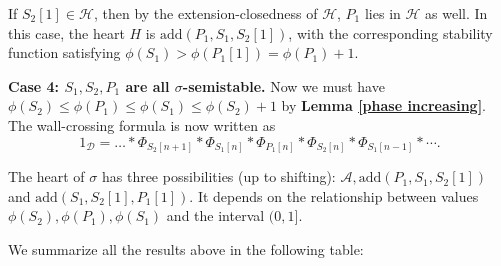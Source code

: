 \documentclass[a4paper,12pt]{amsart}
\newcommand{\add}{\mathrm{add}}
\begin{document}
If $S_2[1]\in\mathcal{H}$, then by the extension-closedness of $\mathcal{H}$, $P_1$ lies in $\mathcal{H}$ as well. In this case, the heart $H$ is $\add(P_1,S_1,S_2[1])$, with the corresponding stability function satisfying $\phi(S_1)>\phi(P_1[1])=\phi(P_1)+1$.

\textbf{Case 4: $S_1,S_2,P_1$ are all $\sigma$-semistable.} Now we must have $\phi(S_2)\leqslant\phi(P_1)\leqslant\phi(S_1)\leqslant\phi(S_2)+1$ by \textbf{Lemma \ref{phase increasing}}. The wall-crossing formula is now written as
\begin{equation}\label{4}
    1_\mathcal{D}=\dots*\Phi_{S_2[n+1]}*\Phi_{S_1[n]}*\Phi_{P_1[n]}*\Phi_{S_2[n]}*\Phi_{S_1[n-1]}*\cdots.
\end{equation}

The heart of $\sigma$ has three possibilities (up to shifting): $\mathcal{A},\add(P_1,S_1,S_2[1])$ and $\add(S_1,S_2[1],P_1[1])$. It depends on the relationship between values $\phi(S_2),\phi(P_1),\phi(S_1)$ and the interval $(0,1]$.

We summarize all the results above in the following table:
\end{document}

